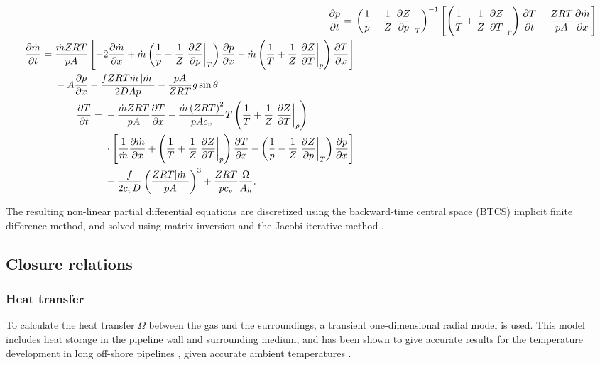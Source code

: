 {\allowdisplaybreaks %
\begin{align}
    \pdt{p} ={}& 
    \del{\frac{1}{p} - \frac{1}{Z} \eval{\dpd{Z}{p}}_T}^{-1}
    \sbr{
    \del{\frac{1}{T} + \frac{1}{Z}\eval{\dpd{Z}{T}}_p} \dpd{T}{t}
    - \frac{ZRT}{pA}\dpd{\dot m}{x}
    }
\label{eq:continuityEquation}
    \\
    \begin{split}
        \pdt{\dot m} ={}& \frac{\dot m ZRT}{pA} 
        \sbr{
            - 2\pdx{\dot m}
            + \dot m \del{\frac{1}{p} - \frac{1}{Z} \eval{\dpd{Z}{p}}_T} \pdx{p}
            - \dot m \del{\frac{1}{T} + \frac{1}{Z} \eval{\dpd{Z}{T}}_p} \pdx{T}
        }
        \\&
        {}- A\pdx{p}
        - \frac{fZRT \dot m \abs{\dot m}}{2DAp}
        - \frac{pA}{ZRT}g\sin\theta
    \end{split}
\label{eq:momentumEquation}
    \\
    \begin{split}
        \pdt{T} ={}&
        - \frac{\dot m ZRT}{pA}\pdx{T}
        - \frac{\dot m \del{ZRT}^2}{pAc_v}T \del{\frac{1}{T} + \frac{1}{Z}\eval{\dpd{Z}{T}}_\rho} \\
        &{}\times 
        \sbr{
            \frac{1}{\dot m}\dpd{\dot m}{x} 
            + \del{\frac{1}{T} + \frac{1}{Z}\eval{\dpd{Z}{T}}_p}\pdx{T}
            - \del{\frac{1}{p} - \frac{1}{Z}\eval{\dpd{Z}{p}}_T}\pdx{p}
        } \\
        &{}+ \frac{f}{2c_vD}\del{\frac{ZRT|\dot m|}{pA}}^3 
        + \frac{ZRT}{p c_v} \frac{\Omega}{A_h}
        .
    \end{split}
\label{eq:energyEquation}
\end{align}
}

The resulting non-linear partial differential equations are discretized using the backward-time central space (BTCS) implicit finite difference method, and solved using matrix inversion and the Jacobi iterative method \cite{Ferziger2002Computational}.

\subsection{Closure relations}
\subsubsection{Heat transfer}
To calculate the heat transfer $\Omega$ between the gas and the surroundings, a transient one-dimensional radial model \cite{Chaczykowski2010Transient} is used. This model includes heat storage in the pipeline wall and surrounding medium, and has been shown to give accurate results for the temperature development in long off-shore pipelines \cite{Helgaker2014Validation,Oosterkamp2015Modelling,Oosterkamp2016Heat}, given accurate ambient temperatures \cite{Sund2015Pipeline}.

